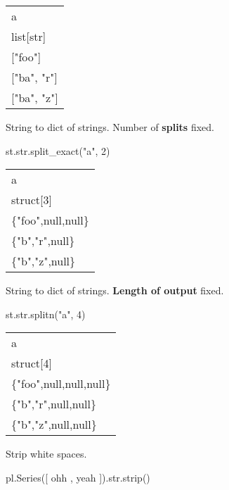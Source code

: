 \documentclass[
  letterpaper,
  DIV=11,
  numbers=noendperiod]{scrartcl}
\newenvironment{Shaded}{\begin{snugshade}}{\end{snugshade}}
\newcommand{\BuiltInTok}[1]{\textcolor[rgb]{0.00,0.23,0.31}{#1}}
\newcommand{\DecValTok}[1]{\textcolor[rgb]{0.68,0.00,0.00}{#1}}
\newcommand{\NormalTok}[1]{\textcolor[rgb]{0.00,0.23,0.31}{#1}}
\newcommand{\StringTok}[1]{\textcolor[rgb]{0.13,0.47,0.30}{#1}}
\begin{document}
\begin{longtable}[]{@{}l@{}}
\toprule()
a \\
list{[}str{]} \\
\midrule()
\endhead
{[}"foo"{]} \\
{[}"ba", "r"{]} \\
{[}"ba", "z"{]} \\
\bottomrule()
\end{longtable}

String to dict of strings. Number of \textbf{splits} fixed.

\begin{Shaded}
\begin{Highlighting}[]
\NormalTok{st.}\BuiltInTok{str}\NormalTok{.split\_exact(}\StringTok{"a"}\NormalTok{, }\DecValTok{2}\NormalTok{)}
\end{Highlighting}
\end{Shaded}

\begin{longtable}[]{@{}l@{}}
\toprule()
a \\
struct{[}3{]} \\
\midrule()
\endhead
\{"foo",null,null\} \\
\{"b","r",null\} \\
\{"b","z",null\} \\
\bottomrule()
\end{longtable}

String to dict of strings. \textbf{Length of output} fixed.

\begin{Shaded}
\begin{Highlighting}[]
\NormalTok{st.}\BuiltInTok{str}\NormalTok{.splitn(}\StringTok{"a"}\NormalTok{, }\DecValTok{4}\NormalTok{)}
\end{Highlighting}
\end{Shaded}

\begin{longtable}[]{@{}l@{}}
\toprule()
a \\
struct{[}4{]} \\
\midrule()
\endhead
\{"foo",null,null,null\} \\
\{"b","r",null,null\} \\
\{"b","z",null,null\} \\
\bottomrule()
\end{longtable}

Strip white spaces.

\begin{Shaded}
\begin{Highlighting}[]
\NormalTok{pl.Series([}\StringTok{\textquotesingle{}   ohh   \textquotesingle{}}\NormalTok{,}\StringTok{\textquotesingle{}   yeah   \textquotesingle{}}\NormalTok{]).}\BuiltInTok{str}\NormalTok{.strip()}
\end{Highlighting}
\end{Shaded}
\end{document}
